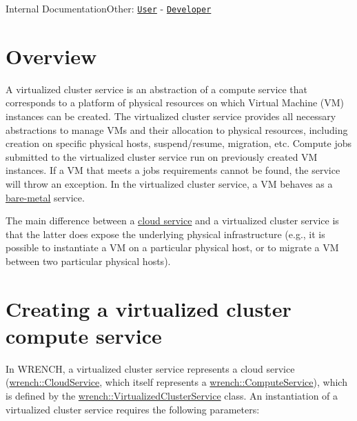Internal DocumentationOther\+: \href{../user/guide-virtualizedcluster.html}{\tt User} -\/ \href{../developer/guide-virtualizedcluster.html}{\tt Developer}\hypertarget{guide-virtualizedcluster_guide-virtualizedcluster-overview}{}\section{Overview}\label{guide-virtualizedcluster_guide-virtualizedcluster-overview}
A virtualized cluster service is an abstraction of a compute service that corresponds to a platform of physical resources on which Virtual Machine (VM) instances can be created. The virtualized cluster service provides all necessary abstractions to manage V\+Ms and their allocation to physical resources, including creation on specific physical hosts, suspend/resume, migration, etc. Compute jobs submitted to the virtualized cluster service run on previously created VM instances. If a VM that meets a job\textquotesingle{}s requirements cannot be found, the service will throw an exception. In the virtualized cluster service, a VM behaves as a \hyperlink{guide-baremetal}{bare-\/metal} service.

The main difference between a \hyperlink{guide-cloud}{cloud service} and a virtualized cluster service is that the latter does expose the underlying physical infrastructure (e.\+g., it is possible to instantiate a VM on a particular physical host, or to migrate a VM between two particular physical hosts).\hypertarget{guide-virtualizedcluster_guide-virtualizedcluster-creating}{}\section{Creating a virtualized cluster compute service}\label{guide-virtualizedcluster_guide-virtualizedcluster-creating}
In W\+R\+E\+N\+CH, a virtualized cluster service represents a cloud service (\hyperlink{classwrench_1_1_cloud_service}{wrench\+::\+Cloud\+Service}, which itself represents a \hyperlink{classwrench_1_1_compute_service}{wrench\+::\+Compute\+Service}), which is defined by the \hyperlink{classwrench_1_1_virtualized_cluster_service}{wrench\+::\+Virtualized\+Cluster\+Service} class. An instantiation of a virtualized cluster service requires the following parameters\+:


